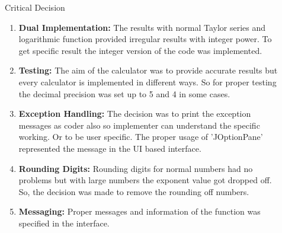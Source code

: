 \documentclass[final]{beamer}
\newlength{\sepwid}
\newlength{\onecolwid}
\newlength{\twocolwid}
\begin{document}
\begin{frame}
\begin{columns}[t]
\begin{column}{\twocolwid}
\begin{columns}[t,totalwidth=\twocolwid]
\begin{column}{\onecolwid}
\end{column} %
\begin{column}{\sepwid}\end{column} %

\begin{column}{\onecolwid}\vspace{-.74in} %


\begin{exampleblock}{Critical Decision}

\begin{enumerate}
\item \textbf{Dual Implementation: } The results with normal Taylor series and logarithmic function provided irregular results with integer power. To get specific result the integer version of the code was implemented.
\item \textbf{Testing: } The aim of the calculator was to provide accurate results but every calculator is implemented in different ways. So for proper testing the decimal precision was set up to 5 and 4 in some cases.
\item \textbf{Exception Handling: } The decision was to print the exception messages as coder also so implementer can understand the specific working. Or to be user specific. The proper usage of 'JOptionPane' represented the message in the UI based interface.
\item \textbf{Rounding Digits: } Rounding digits for normal numbers had no problems but with large numbers the exponent value got dropped off. So, the decision was made to remove the rounding off numbers.
\item \textbf{Messaging: }Proper messages and information of the function was specified in the interface.
\end{enumerate}
\end{exampleblock}


\end{column} %

\end{columns} %


\end{column}
\end{columns}
\end{frame}
\end{document}

